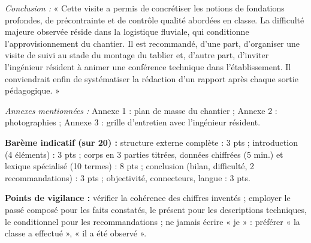 \documentclass[11pt]{article}
\begin{document}
\begin{corrige}
\emph{Conclusion :} « Cette visite a permis de concrétiser les notions de fondations profondes, de précontrainte et de contrôle qualité abordées en classe. La difficulté majeure observée réside dans la logistique fluviale, qui conditionne l'approvisionnement du chantier. Il est recommandé, d'une part, d'organiser une visite de suivi au stade du montage du tablier et, d'autre part, d'inviter l'ingénieur résident à animer une conférence technique dans l'établissement. Il conviendrait enfin de systématiser la rédaction d'un rapport après chaque sortie pédagogique. »

\emph{Annexes mentionnées :} Annexe 1 : plan de masse du chantier ; Annexe 2 : photographies ; Annexe 3 : grille d'entretien avec l'ingénieur résident.

\textbf{Barème indicatif (sur 20) :} structure externe complète : 3 pts ; introduction (4 éléments) : 3 pts ; corps en 3 parties titrées, données chiffrées (5 min.) et lexique spécialisé (10 termes) : 8 pts ; conclusion (bilan, difficulté, 2 recommandations) : 3 pts ; objectivité, connecteurs, langue : 3 pts.

\textbf{Points de vigilance :} vérifier la cohérence des chiffres inventés ; employer le passé composé pour les faits constatés, le présent pour les descriptions techniques, le conditionnel pour les recommandations ; ne jamais écrire « je » : préférer « la classe a effectué », « il a été observé ».
\end{corrige}
\end{document}
